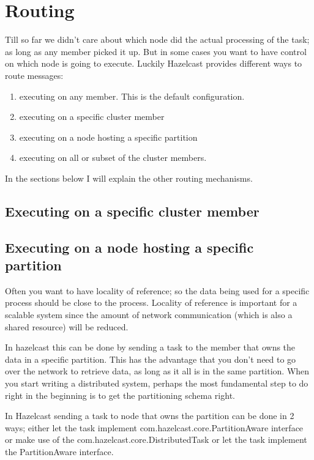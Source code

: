 \section{Routing}

Till so far we didn't care about which node did the actual processing of the task; as long as any member picked it up. But in some cases you want to have control on which node is going to execute. Luckily Hazelcast provides different ways to route messages:
\begin{enumerate}
\item executing on any member. This is the default configuration.
\item executing on a specific cluster member
\item executing on a node hosting a specific partition
\item executing on all or subset of the cluster members.
\end{enumerate}
In the sections below I will explain the other routing mechanisms.

\subsection{Executing on a specific cluster member}

\subsection{Executing on a node hosting a specific partition}
Often you want to have locality of reference; so the data being used for a specific process should be close to the process. Locality of reference is important for a scalable system since the amount of network communication (which is also a shared resource) will be reduced.

In hazelcast this can be done by sending a task to the member that owns the data in a specific partition. This has the advantage that you don't need to go over the network to retrieve data, as long as it all is in the same partition. When you start writing a distributed system, perhaps the most fundamental step to do right in the beginning is to get the partitioning schema right.

In Hazelcast sending a task to node that owns the partition can be done in 2 ways; either let the task implement com.hazelcast.core.PartitionAware interface or make use of the com.hazelcast.core.DistributedTask or let the task implement the PartitionAware interface.

